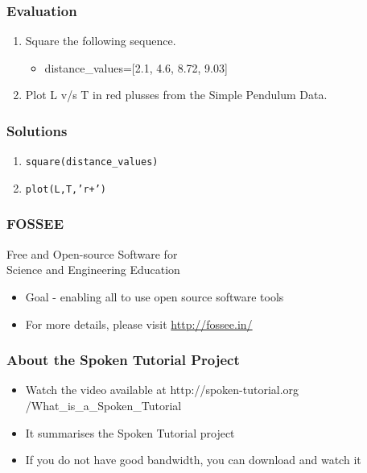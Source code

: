 \documentclass[17pt,compress]{beamer}
\begin{document}
\begin{frame}
\frametitle{Evaluation}
\label{sec-9}

\begin{enumerate}
\item Square the following sequence.
	\begin{itemize}
	\item distance\_values=[2.1, 4.6, 8.72, 9.03]\pause
	\end{itemize}
\vspace{8pt}
\item Plot L v/s T in red plusses from the Simple Pendulum Data.
\end{enumerate}
\end{frame}
\begin{frame}
\frametitle{Solutions}
\label{sec-10}

\begin{enumerate}
\item \texttt{square(distance\_values)}\pause
\vspace{8pt}
\item \texttt{plot(L,T,'r+')}
\end{enumerate}
\end{frame}
\begin{frame}
\frametitle{FOSSEE}
{\color{blue}Free and Open-source Software for \\Science and Engineering Education} \\
\begin{itemize}
\item Goal - enabling all to use open source software tools
\item For more details, please visit {\color{blue}\url{http://fossee.in/}}
\end{itemize}
\end{frame}
\begin{frame}
\frametitle{About the Spoken Tutorial Project}
\begin{itemize}
\item Watch the video available at {\color{blue}http://spoken-tutorial.org /What\_is\_a\_Spoken\_Tutorial}
\item It summarises the Spoken Tutorial project \pause
\item If you do not have good bandwidth, you can download and watch it
\end{itemize}
\end{frame}
\end{document}
